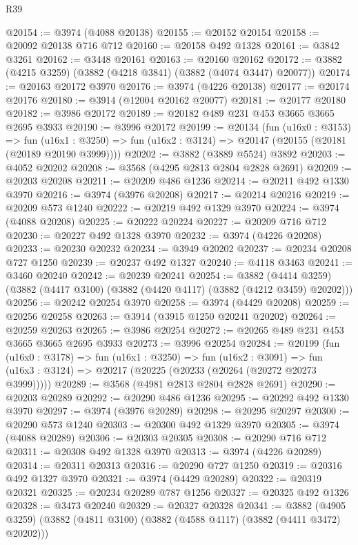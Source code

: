 \begin{lexlean}{R39}
\begin{coremodule}
@20154 := @3974 (@4088 @20138)
@20155 := @20152 @20154
@20158 := @20092 @20138 @716 @712
@20160 := @20158 @492 @1328
@20161 := @3842 @3261
@20162 := @3448 @20161
@20163 := @20160 @20162
@20172 := @3882 (@4215 @3259) (@3882 (@4218 @3841) (@3882 (@4074 @3447) @20077))
@20174 := @20163 @20172 @3970
@20176 := @3974 (@4226 @20138)
@20177 := @20174 @20176
@20180 := @3914 (@12004 @20162 @20077)
@20181 := @20177 @20180
@20182 := @3986 @20172
@20189 := @20182 @489 @231 @453 @3665 @3665 @2695 @3933
@20190 := @3996 @20172
@20199 := @20134
    (fun (u16x0 : @3153) =>
    fun (u16x1 : @3250) => fun (u16x2 : @3124) => @20147 (@20155 (@20181 (@20189 @20190 @3999))))
@20202 := @3882 (@3889 @5524) @3892
@20203 := @4052 @20202
@20208 := @3568 (@4295 @2813 @2804 @2828 @2691)
@20209 := @20203 @20208
@20211 := @20209 @486 @1236
@20214 := @20211 @492 @1330 @3970
@20216 := @3974 (@3976 @20208)
@20217 := @20214 @20216
@20219 := @20209 @573 @1240
@20222 := @20219 @492 @1329 @3970
@20224 := @3974 (@4088 @20208)
@20225 := @20222 @20224
@20227 := @20209 @716 @712
@20230 := @20227 @492 @1328 @3970
@20232 := @3974 (@4226 @20208)
@20233 := @20230 @20232
@20234 := @3949 @20202
@20237 := @20234 @20208 @727 @1250
@20239 := @20237 @492 @1327
@20240 := @4118 @3463
@20241 := @3460 @20240
@20242 := @20239 @20241
@20254 := @3882
    (@4414 @3259)
    (@3882 (@4417 @3100) (@3882 (@4420 @4117) (@3882 (@4212 @3459) @20202)))
@20256 := @20242 @20254 @3970
@20258 := @3974 (@4429 @20208)
@20259 := @20256 @20258
@20263 := @3914 (@3915 @1250 @20241 @20202)
@20264 := @20259 @20263
@20265 := @3986 @20254
@20272 := @20265 @489 @231 @453 @3665 @3665 @2695 @3933
@20273 := @3996 @20254
@20284 := @20199
    (fun (u16x0 : @3178) =>
    fun (u16x1 : @3250) =>
    fun (u16x2 : @3091) =>
    fun (u16x3 : @3124) => @20217 (@20225 (@20233 (@20264 (@20272 @20273 @3999)))))
@20289 := @3568 (@4981 @2813 @2804 @2828 @2691)
@20290 := @20203 @20289
@20292 := @20290 @486 @1236
@20295 := @20292 @492 @1330 @3970
@20297 := @3974 (@3976 @20289)
@20298 := @20295 @20297
@20300 := @20290 @573 @1240
@20303 := @20300 @492 @1329 @3970
@20305 := @3974 (@4088 @20289)
@20306 := @20303 @20305
@20308 := @20290 @716 @712
@20311 := @20308 @492 @1328 @3970
@20313 := @3974 (@4226 @20289)
@20314 := @20311 @20313
@20316 := @20290 @727 @1250
@20319 := @20316 @492 @1327 @3970
@20321 := @3974 (@4429 @20289)
@20322 := @20319 @20321
@20325 := @20234 @20289 @787 @1256
@20327 := @20325 @492 @1326
@20328 := @3473 @20240
@20329 := @20327 @20328
@20341 := @3882
    (@4905 @3259)
    (@3882 (@4811 @3100) (@3882 (@4588 @4117) (@3882 (@4411 @3472) @20202)))

\end{coremodule}
\end{lexlean}
